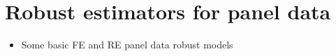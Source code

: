 \chapter{Robust estimators for panel data}
\label{chap:panel}

\begin{itemize}
\item
    Some basic FE and RE panel data robust models       %
\end{itemize}


\endinput
